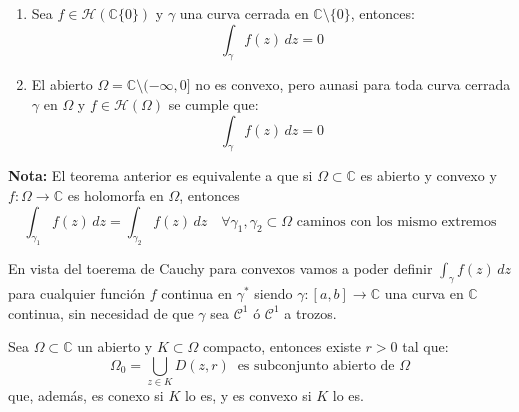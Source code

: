 {\begin{enumerate}
\begin{center}
        \end{center}
        \item Sea $f \in \mathcal{H}(\mathbb{C} \{0\})$ y $\gamma$ una curva cerrada en $\mathbb{C} \setminus \{0\}$, entonces:
        \[
            \int_{\gamma} f(z) \, dz = 0
        \]
        \item El abierto $\Omega = \mathbb{C} \setminus (-\infty, 0]$ no es convexo, pero aunasi para toda curva cerrada $\gamma$ en $\Omega$ y $f \in \mathcal{H}(\Omega)$ se cumple que:
        \[
            \int_{\gamma} f(z) \, dz = 0
        \]
    \end{enumerate}
}

\textbf{Nota:} El teorema anterior es equivalente a que si $\Omega \subset \mathbb{C}$ es abierto y convexo y $f: \Omega \to \mathbb{C}$ es holomorfa en $\Omega$, entonces
\[
    \int_{\gamma_1} f(z) \, dz = \int_{\gamma_2} f(z) \, dz \quad \forall \gamma_1, \gamma_2 \subset \Omega \text{ caminos con los mismo extremos}
\]

En vista del toerema de Cauchy para convexos vamos a poder definir $\int_{\gamma} f(z) \, dz$ para cualquier función $f$ continua en $\gamma^*$ siendo $\gamma : [a, b] \to \mathbb{C}$ una curva en $\mathbb{C}$ continua, sin necesidad de que $\gamma$ sea $\mathcal{C}^1$ ó $\mathcal{C}^1$ a trozos.

\begin{lema}
    Sea $\Omega \subset \mathbb{C}$ un abierto y $K \subset \Omega$ compacto, entonces existe $r > 0$ tal que:
    \[
        \Omega_0 = \bigcup_{z \in K} D(z, r) \ \text{ es subconjunto abierto de } \Omega
    \]
    que, además, es conexo si $K$ lo es, y es convexo si $K$ lo es.
\end{lema}

